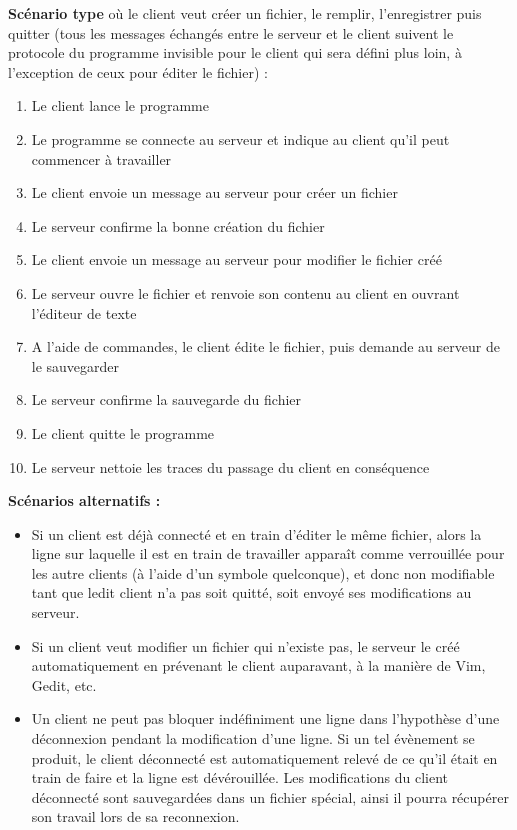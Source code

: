 \documentclass[12pt]{article}
\begin{document}
\textbf{Scénario type} où le client veut créer un fichier, le remplir, l'enregistrer puis quitter (tous les messages échangés entre le serveur et le client suivent le protocole du programme invisible pour le client qui sera défini plus loin, à l'exception de ceux pour éditer le fichier) :

\begin{enumerate}
\item Le client lance le programme
\item Le programme se connecte au serveur et indique au client qu'il peut commencer à travailler
\item Le client envoie un message au serveur pour créer un fichier
\item Le serveur confirme la bonne création du fichier
\item Le client envoie un message au serveur pour modifier le fichier créé
\item Le serveur ouvre le fichier et renvoie son contenu au client en ouvrant l'éditeur de texte
\item A l'aide de commandes, le client édite le fichier, puis demande au serveur de le sauvegarder
\item Le serveur confirme la sauvegarde du fichier
\item Le client quitte le programme
\item Le serveur nettoie les traces du passage du client en conséquence\\
\end{enumerate}

\textbf{Scénarios alternatifs :}
\begin{itemize}
\item Si un client est déjà connecté et en train d'éditer le même fichier, alors la ligne sur laquelle il est en train de travailler apparaît comme verrouillée pour les autre clients (à l'aide d'un symbole quelconque), et donc non modifiable tant que ledit client n'a pas soit quitté, soit envoyé ses modifications au serveur.
\item Si un client veut modifier un fichier qui n'existe pas, le serveur le créé automatiquement en prévenant le client auparavant, à la manière de Vim, Gedit, etc.
\item Un client ne peut pas bloquer indéfiniment une ligne dans l'hypothèse d'une déconnexion pendant la modification d'une ligne. Si un tel évènement se produit, le client déconnecté est automatiquement relevé de ce qu'il était en train de faire et la ligne est dévérouillée. Les modifications du client déconnecté sont sauvegardées dans un fichier spécial, ainsi il pourra récupérer son travail lors de sa reconnexion.
\end{itemize}
\end{document}
